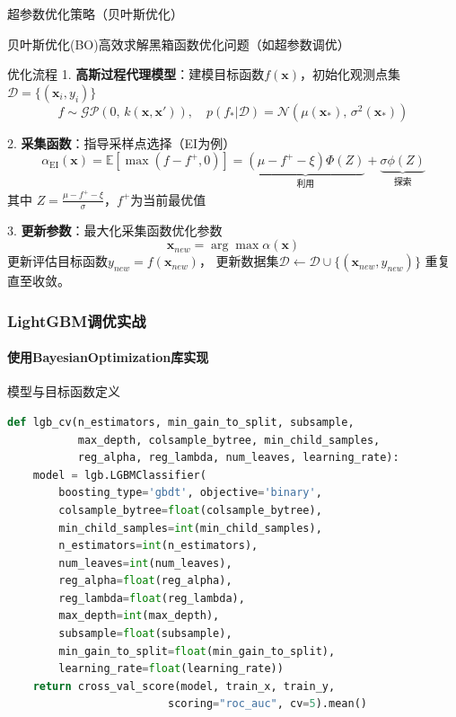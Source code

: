 \documentclass{ctexbeamer}
\begin{document}
\begin{frame}{超参数优化策略（贝叶斯优化）}

\small
贝叶斯优化(BO)高效求解黑箱函数优化问题（如超参数调优）

\begin{block}{优化流程}
1. \textbf{高斯过程代理模型}：建模目标函数$f(\mathbf{x})$，初始化观测点集 $\mathcal{D} = \{(\mathbf{x}_i,y_i)\}$
\[
f \sim \mathcal{GP}\left(0,\, k(\mathbf{x}, \mathbf{x}')\right), \quad
p(f_{*}|\mathcal{D}) = \mathcal{N}(\mu(\mathbf{x}_{*}),\, \sigma^2(\mathbf{x}_{*}))
\]

2. \textbf{采集函数}：指导采样点选择（EI为例）
\[
\alpha_{\text{EI}}(\mathbf{x}) = \mathbb{E}[\max(f-f^+,0)] = 
\underbrace{(\mu - f^+ - \xi)\Phi(Z)}_{\text{利用}} + 
\underbrace{\sigma\phi(Z)}_{\text{探索}}
\]
其中 $Z=\frac{\mu-f^+-\xi}{\sigma}$，$f^+$为当前最优值

3. \textbf{更新参数}：最大化采集函数优化参数
\[ 
\mathbf{x}_{new} = \arg\max \alpha(\mathbf{x})
\]
更新评估目标函数$y_{new} = f(\mathbf{x}_{new})$，
更新数据集$\mathcal{D} \leftarrow \mathcal{D} \cup \{(\mathbf{x}_{new},y_{new})\}$
重复直至收敛。
\end{block}

\end{frame}


\begin{frame}[fragile]
\frametitle{LightGBM调优实战}
\framesubtitle{使用BayesianOptimization库实现}
\scriptsize
\begin{block}{模型与目标函数定义}
\begin{lstlisting}[language=Python]
def lgb_cv(n_estimators, min_gain_to_split, subsample, 
           max_depth, colsample_bytree, min_child_samples,
           reg_alpha, reg_lambda, num_leaves, learning_rate):
    model = lgb.LGBMClassifier(
        boosting_type='gbdt', objective='binary',
        colsample_bytree=float(colsample_bytree),
        min_child_samples=int(min_child_samples),
        n_estimators=int(n_estimators),
        num_leaves=int(num_leaves),
        reg_alpha=float(reg_alpha),
        reg_lambda=float(reg_lambda),
        max_depth=int(max_depth),
        subsample=float(subsample),
        min_gain_to_split=float(min_gain_to_split),
        learning_rate=float(learning_rate))
    return cross_val_score(model, train_x, train_y, 
                         scoring="roc_auc", cv=5).mean()
\end{lstlisting}
\end{block}
\end{frame}
\end{document}
